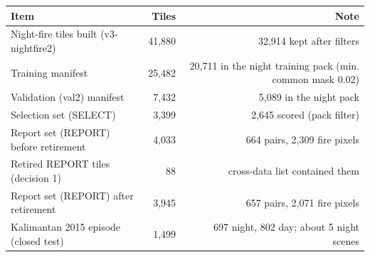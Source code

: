 \begin{tabular}{lrr}
\toprule
Item & Tiles & Note \\
\midrule
Night-fire tiles built (v3-nightfire2) & 41,880 & 32,914 kept after filters \\
Training manifest & 25,482 & 20,711 in the night training pack (min. common mask 0.02) \\
Validation (val2) manifest & 7,432 & 5,089 in the night pack \\
Selection set (SELECT) & 3,399 & 2,645 scored (pack filter) \\
Report set (REPORT) before retirement & 4,033 & 664 pairs, 2,309 fire pixels \\
Retired REPORT tiles (decision 1) & 88 & cross-data list contained them \\
Report set (REPORT) after retirement & 3,945 & 657 pairs, 2,071 fire pixels \\
Kalimantan 2015 episode (closed test) & 1,499 & 697 night, 802 day; about 5 night scenes \\
\bottomrule
\end{tabular}
